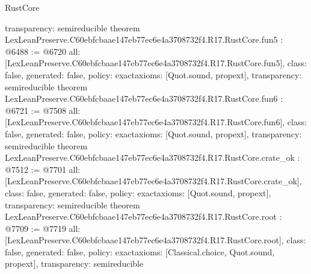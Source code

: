 \begin{lexlean}{RustCore}
\begin{coremodule}
{  transparency: semireducible
}
theorem LexLeanPreserve.C60ebfcbaae147eb77ec6e4a3708732f4.R17.RustCore.fun5 : @6488 := @6720 {
  all: [LexLeanPreserve.C60ebfcbaae147eb77ec6e4a3708732f4.R17.RustCore.fun5],
  class: false,
  generated: false,
  policy: exact{axioms: [Quot.sound, propext]},
  transparency: semireducible
}
theorem LexLeanPreserve.C60ebfcbaae147eb77ec6e4a3708732f4.R17.RustCore.fun6 : @6721 := @7508 {
  all: [LexLeanPreserve.C60ebfcbaae147eb77ec6e4a3708732f4.R17.RustCore.fun6],
  class: false,
  generated: false,
  policy: exact{axioms: [Quot.sound, propext]},
  transparency: semireducible
}
theorem LexLeanPreserve.C60ebfcbaae147eb77ec6e4a3708732f4.R17.RustCore.crate_ok : @7512 := @7701 {
  all: [LexLeanPreserve.C60ebfcbaae147eb77ec6e4a3708732f4.R17.RustCore.crate_ok],
  class: false,
  generated: false,
  policy: exact{axioms: [Quot.sound, propext]},
  transparency: semireducible
}
theorem LexLeanPreserve.C60ebfcbaae147eb77ec6e4a3708732f4.R17.RustCore.root : @7709 := @7719 {
  all: [LexLeanPreserve.C60ebfcbaae147eb77ec6e4a3708732f4.R17.RustCore.root],
  class: false,
  generated: false,
  policy: exact{axioms: [Classical.choice, Quot.sound, propext]},
  transparency: semireducible
}


\end{coremodule}
\end{lexlean}

